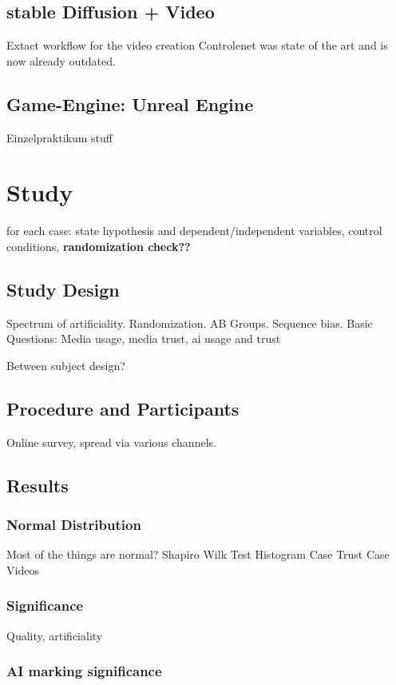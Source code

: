 \documentclass[
  a4paper,  %
  twoside,  %
  bibliography=totoc,
  headsepline,
  cleardoublepage=empty,
  parskip=half,
  draft=false
]{scrbook}
\begin{document}
\subsection{stable Diffusion + Video}
\label{sec:sd-video}
Extact workflow for the video creation 
Controlenet was state of the art and is now already outdated. 

\subsection{Game-Engine: Unreal Engine}
Einzelpraktikum stuff

\section{Study}

for each case: state hypothesis and dependent/independent variables, control conditions, \textbf{randomization check??}

\label{study}
\subsection{Study Design}
\label{subsec:study design}
Spectrum of artificiality.
Randomization.
AB Groups. 
Sequence bias.
Basic Questions: Media usage, media trust, ai usage and trust

Between subject design? 

\subsection{Procedure and Participants}
Online survey, spread via various channels.

\subsection{Results}

\subsubsection{Normal Distribution}
Most of the things are normal?
Shapiro Wilk Test
Histogram
Case Trust
Case Videos

\subsubsection{Significance}
Quality, artificiality

\subsubsection{AI marking significance}
\end{document}
